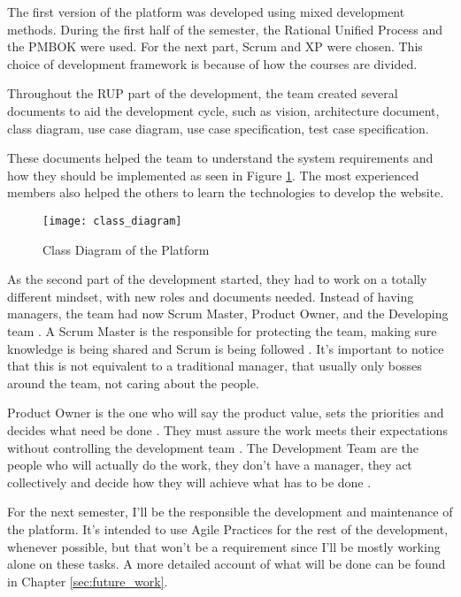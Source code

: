 The first version of the platform was developed using mixed development methods. During the first half of the semester, the Rational Unified Process and the PMBOK were used. For the next part, Scrum and XP were chosen. This choice of development framework is because of how the courses are divided.

Throughout the RUP part of the development, the team created several documents to aid the development cycle, such as vision, architecture document, class diagram, use case diagram, use case specification, test case specification.

These documents helped the team to understand the system requirements and how they should be implemented as seen in Figure \ref{fig:class_diagram}. The most experienced members also helped the others to learn the technologies to develop the website.


\begin{figure}[h!]
\centering
\texttt{[image: class\_diagram]}
\caption{Class Diagram of the Platform \cite{plataforma2017arquitetura}}
\label{fig:class_diagram}
\end{figure}

As the second part of the development started, they had to work on a totally different mindset, with new roles and documents needed. Instead of having managers, the team had now Scrum Master, Product Owner, and the Developing team \cite{agile422017}. A Scrum Master is the responsible for protecting the team, making sure knowledge is being shared and Scrum is being followed \cite{scrumalliance2017}. It's important to notice that this is not equivalent to a traditional manager, that usually only bosses around the team, not caring about the people.

Product Owner is the one who will say the product value, sets the priorities and decides what need be done \cite{agile422017}. They must assure the work meets their expectations without controlling the development team \cite{scrumalliance2017}. The Development Team are the people who will actually do the work, they don't have a manager, they act collectively and decide how they will achieve what has to be done \cite{scrumalliance2017}.

For the next semester, I'll be the responsible the development and maintenance of the platform. It's intended to use Agile Practices for the rest of the development, whenever possible, but that won't be a requirement since I'll be mostly working alone on these tasks. A more detailed account of what will be done can be found in Chapter \ref{sec:future_work}.



